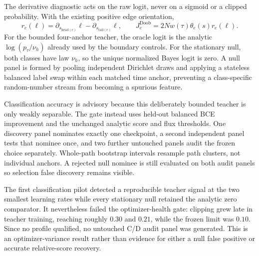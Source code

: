 \documentclass[11pt]{article}
\numberwithin{equation}{section}
\newcommand{\1}{\mathbf 1}
\begin{document}
The derivative diagnostic acts on the raw logit, never on a sigmoid or a
clipped probability.  With the existing positive edge orientation,
\[
  r_e(\ell)=\partial_{s_{\mathrm{head}(e)}}\ell
             -\partial_{s_{\mathrm{tail}(e)}}\ell,
  \qquad
  J_e^{\mathrm{Doob}}=2Nw(\tau)\theta_e(s)r_e(\ell).
\]
For the bounded four-anchor teacher, the oracle logit is the analytic
\(\log(p_\tau/\nu_h)\) already used by the boundary controls.  For the
stationary null, both classes have law \(\nu_h\), so the unique normalized
Bayes logit is zero.  A null panel is formed by pooling independent Dirichlet
draws and applying a stateless balanced label swap within each matched time
anchor, preventing a class-specific random-number stream from becoming a
spurious feature.

Classification accuracy is advisory because this deliberately bounded
teacher is only weakly separable.  The gate instead uses held-out balanced BCE
improvement and the unchanged analytic score and flux thresholds.  One
discovery panel nominates exactly one checkpoint, a second independent panel
tests that nominee once, and two further untouched panels audit the frozen
choice separately.  Whole-path bootstrap intervals resample path clusters,
not individual anchors.  A rejected null nominee is still evaluated on both
audit panels so selection false discovery remains visible.

The first classification pilot detected a reproducible teacher signal at the
two smallest learning rates while every stationary null retained the analytic
zero comparator.  It nevertheless failed the optimizer-health gate: clipping
grew late in teacher training, reaching roughly \(0.30\) and \(0.21\), while
the frozen limit was \(0.10\).  Since no profile qualified, no untouched C/D
audit panel was generated.  This is an optimizer-variance result rather than
evidence for either a null false positive or accurate relative-score recovery.
\end{document}
